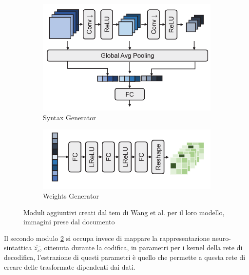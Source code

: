 \begin{figure}[h!]
    \centering
    \begin{subfigure}[]{0.4\textwidth}
        \includegraphics[width=\textwidth]{Immagini/Wang2022_SyntaxGenerator.png}
        \caption{Syntax Generator}
        \label{fig:Wang2022SyntaxGenerator}
    \end{subfigure}
    \hspace*{1 cm}
    \begin{subfigure}[]{0.4\textwidth}
        \includegraphics[width=\textwidth]{Immagini/Wang2022_WeightsGenerator.png}
        \caption{Weights Generator}
        \label{fig:Wang2022WeightsGenerator}
    \end{subfigure}
    \caption{Moduli aggiuntivi creati dal tem di Wang et al. per il loro modello, immagini prese dal documento \cite{wang2022neural}}
    \label{fig:Wang2022Modules}
\end{figure}
Il secondo modulo \ref{fig:Wang2022WeightsGenerator} si occupa invece di mappare la rappresentazione neuro-sintattica $\hat{z_{s}}$, ottenuta durante la codifica, in parametri per i kernel della rete di decodifica, l’estrazione di questi parametri è quello che permette a questa rete di creare delle trasformate dipendenti dai dati.\\
